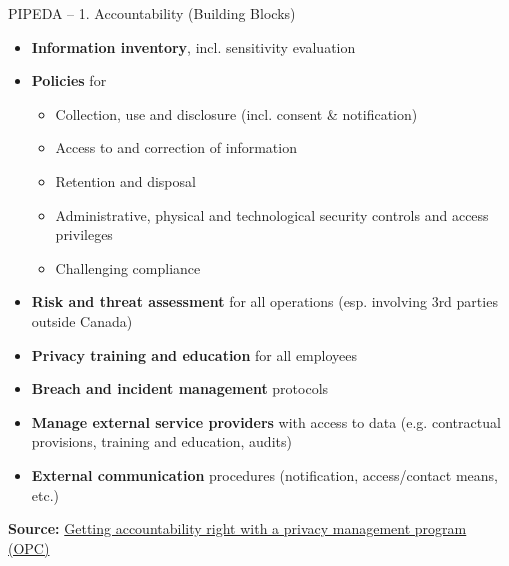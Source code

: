 \documentclass[ignorenonframetext,xcolor=x11names]{beamer}
\begin{document}
\begin{frame}[label=full]{PIPEDA -- 1. Accountability \small (Building Blocks)}
   \begin{itemize}
      \item \textbf{Information inventory}, incl. sensitivity evaluation
      \item \textbf{Policies} for
         \begin{itemize}
           \item Collection, use and disclosure (incl. consent \& notification)
           \item Access to and correction of information
           \item Retention and disposal
           \item Administrative, physical and technological security controls and access privileges
           \item Challenging compliance
         \end{itemize}
      \item \textbf{Risk and threat assessment} for all operations (esp. involving 3rd parties outside Canada)
      \item \textbf{Privacy training and education} for all employees
      \item \textbf{Breach and incident management} protocols
      \item \textbf{Manage external service providers} with access to data (e.g. contractual provisions, training and education, audits)
      \item \textbf{External communication} procedures (notification, access/contact means, etc.)
   \end{itemize}

\vspace{.5\baselineskip}
\scriptsize \textbf{Source:} \href{https://www.priv.gc.ca/en/privacy-topics/privacy-laws-in-canada/the-personal-information-protection-and-electronic-documents-act-pipeda/pipeda-compliance-help/pipeda-compliance-and-training-tools/gl_acc_201204/}{Getting accountability right with a privacy management program (OPC)}
\end{frame}
\end{document}
